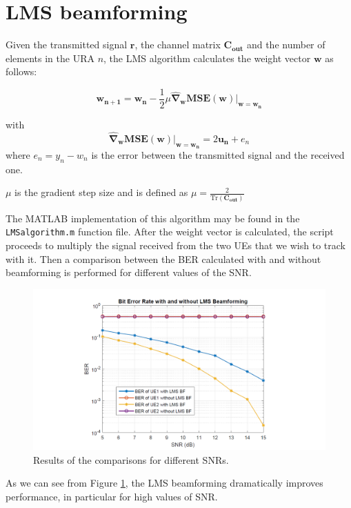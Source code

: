 \documentclass[a4paper,10pt]{article}
\begin{document}
\section{LMS beamforming}
Given the transmitted signal $\mathbf{r}$, the channel matrix $\mathbf{C_{out}}$ and the number of elements in the URA $n$, the LMS algorithm calculates the weight vector $\mathbf{w}$ as follows:

$$ \mathbf{w_{n+1}} = \mathbf{w_{n}}-\frac{1}{2}\mu \mathbf{\widehat{\nabla}_w MSE}(\mathbf{w})|_{\mathbf{w=w_n}} $$

with $$\mathbf{\widehat{\nabla}_w MSE}(\mathbf{w})|_{\mathbf{w=w_n}} = 2\mathbf{u_n}+e_n$$ 
where $e_n = y_n - w_n$ is the error between the transmitted signal and the received one.

\noindent $\mu$ is the gradient step size and is defined as $\displaystyle \mu = \frac{2}{\mathrm{Tr}(\mathbf{C_{out}})}$ 

The MATLAB implementation of this algorithm may be found in the \texttt{LMSalgorithm.m} function file. After the weight vector is calculated, the script proceeds to multiply the signal received from the two UEs that we wish to track with it. Then a comparison between the BER calculated with and without beamforming is performed for different values of the SNR.

\begin{figure}[H]
	\centering
	\includegraphics[width=\linewidth]{bersnr.png}
	\caption{\label{fig:bersnr}Results of the comparisons for different SNRs.}
\end{figure}
As we can see from Figure \ref{fig:bersnr}, the LMS beamforming dramatically improves performance, in particular for high values of SNR.
\end{document}
